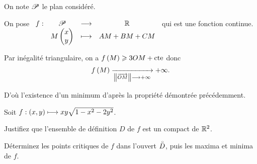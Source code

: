 \begin{corr}[Exemple]
On note \(\mathscr{P}\) le plan considéré.

On pose \(\begin{array}[t]{cccc}f : & \mathscr{P} & \longrightarrow & \mathbb{R} \\ & M\begin{pmatrix}x\\y\end{pmatrix} & \longmapsto & AM+BM+CM\end{array}\) qui est une fonction continue.

Par inégalité triangulaire, on a \(f\left(M\right)\geqslant3OM+\mathrm{cte}\) donc \[f\paren{M}\tendqd{\norme{\overrightarrow{OM}}\to\pinf}\pinf.\]

D'où l'existence d'un minimum d'après la propriété démontrée précédemment.
\end{corr}

\begin{exo}
Soit \(f:\left(x,y\right)\longmapsto xy\sqrt{1-x^2-2y^2}\).

Justifiez que l'ensemble de définition \(D\) de \(f\) est un compact de \(\mathbb{R}^2\).

Déterminez les points critiques de \(f\) dans l'ouvert \(\accentset{\circ}{D}\), puis les maxima et minima de \(f\).
\end{exo}

